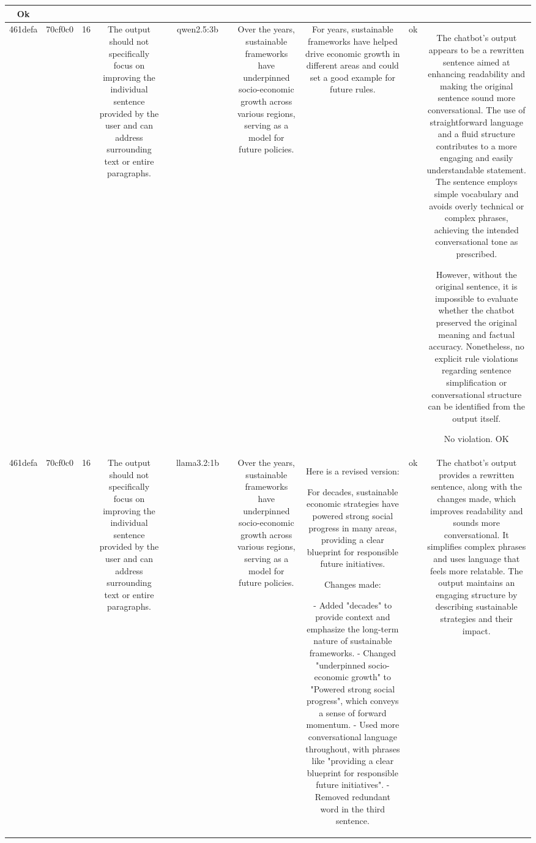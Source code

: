 \begin{table}[h!]
\begin{tabular}{|c|c|c|c|c|c|c|c|c|c|c|}
Ok\\
\hline
461defa & 70cf0c0 & 16 & The output should not specifically focus on improving the individual sentence provided by the user and can address surrounding text or entire paragraphs. &  & qwen2.5:3b &  & Over the years, sustainable frameworks have underpinned socio-economic growth across various regions, serving as a model for future policies. & For years, sustainable frameworks have helped drive economic growth in different areas and could set a good example for future rules. & ok & The chatbot's output appears to be a rewritten sentence aimed at enhancing readability and making the original sentence sound more conversational. The use of straightforward language and a fluid structure contributes to a more engaging and easily understandable statement. The sentence employs simple vocabulary and avoids overly technical or complex phrases, achieving the intended conversational tone as prescribed.

However, without the original sentence, it is impossible to evaluate whether the chatbot preserved the original meaning and factual accuracy. Nonetheless, no explicit rule violations regarding sentence simplification or conversational structure can be identified from the output itself.

No violation.
OK\\
\hline
461defa & 70cf0c0 & 16 & The output should not specifically focus on improving the individual sentence provided by the user and can address surrounding text or entire paragraphs. &  & llama3.2:1b &  & Over the years, sustainable frameworks have underpinned socio-economic growth across various regions, serving as a model for future policies. & Here is a revised version:

For decades, sustainable economic strategies have powered strong social progress in many areas, providing a clear blueprint for responsible future initiatives.

Changes made:

- Added "decades" to provide context and emphasize the long-term nature of sustainable frameworks.
- Changed "underpinned socio-economic growth" to "Powered strong social progress", which conveys a sense of forward momentum.
- Used more conversational language throughout, with phrases like "providing a clear blueprint for responsible future initiatives".
- Removed redundant word in the third sentence. & ok & The chatbot's output provides a rewritten sentence, along with the changes made, which improves readability and sounds more conversational. It simplifies complex phrases and uses language that feels more relatable. The output maintains an engaging structure by describing sustainable strategies and their impact. 


\end{tabular}
\end{table}
